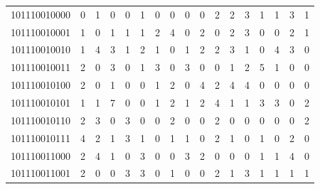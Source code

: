 \documentclass[10pt,a4paper]{article}
\begin{document}
\begin{longtable}{ |c|c|c|c|c|c|c|c|c|c|c|c|c|c|c|c|c| }
    101110010000              & 0                            & 1                                & 0                            & 0                              & 1   & 0   & 0   & 0   & 0   & 2   & 2   & 3   & 1   & 1   & 3   & 1   \\
    101110010001              & 1                            & 0                                & 1                            & 1                              & 1   & 2   & 4   & 0   & 2   & 0   & 2   & 3   & 0   & 0   & 2   & 1   \\
    101110010010              & 1                            & 4                                & 3                            & 1                              & 2   & 1   & 0   & 1   & 2   & 2   & 3   & 1   & 0   & 4   & 3   & 0   \\
    101110010011              & 2                            & 0                                & 3                            & 0                              & 1   & 3   & 0   & 3   & 0   & 0   & 1   & 2   & 5   & 1   & 0   & 0   \\
    101110010100              & 2                            & 0                                & 1                            & 0                              & 0   & 1   & 2   & 0   & 4   & 2   & 4   & 4   & 0   & 0   & 0   & 0   \\
    101110010101              & 1                            & 1                                & 7                            & 0                              & 0   & 1   & 2   & 1   & 2   & 4   & 1   & 1   & 3   & 3   & 0   & 2   \\
    101110010110              & 2                            & 3                                & 0                            & 3                              & 0   & 0   & 2   & 0   & 0   & 2   & 0   & 0   & 0   & 0   & 0   & 2   \\
    101110010111              & 4                            & 2                                & 1                            & 3                              & 1   & 0   & 1   & 1   & 0   & 2   & 1   & 0   & 1   & 0   & 2   & 0   \\
    101110011000              & 2                            & 4                                & 1                            & 0                              & 3   & 0   & 0   & 3   & 2   & 0   & 0   & 0   & 1   & 1   & 4   & 0   \\
    101110011001              & 2                            & 0                                & 0                            & 3                              & 3   & 0   & 1   & 0   & 0   & 2   & 1   & 3   & 1   & 1   & 1   & 1   \\

\end{longtable}
\end{document}
